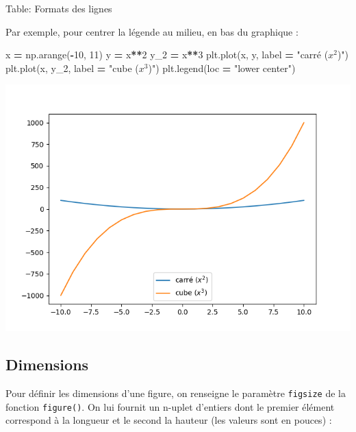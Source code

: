 \documentclass[12pt,]{book}
\newenvironment{Shaded}{\begin{snugshade}}{\end{snugshade}}
\newcommand{\DecValTok}[1]{\textcolor[rgb]{0.00,0.00,0.81}{#1}}
\newcommand{\StringTok}[1]{\textcolor[rgb]{0.31,0.60,0.02}{#1}}
\newcommand{\OperatorTok}[1]{\textcolor[rgb]{0.81,0.36,0.00}{\textbf{#1}}}
\newcommand{\NormalTok}[1]{#1}
\numberwithin{equation}{section}
\numberwithin{countremarque}{section}
\begin{document}
Table: \label{tab:pyplot-legendes-loc} Formats des lignes

Par exemple, pour centrer la légende au milieu, en bas du graphique :

\begin{Shaded}
\begin{Highlighting}[]
\NormalTok{x }\OperatorTok{=}\NormalTok{ np.arange(}\OperatorTok{-}\DecValTok{10}\NormalTok{, }\DecValTok{11}\NormalTok{)}
\NormalTok{y }\OperatorTok{=}\NormalTok{ x}\OperatorTok{**}\DecValTok{2}
\NormalTok{y_2 }\OperatorTok{=}\NormalTok{ x}\OperatorTok{**}\DecValTok{3}
\NormalTok{plt.plot(x, y, label }\OperatorTok{=} \StringTok{"carré ($x^2$)"}\NormalTok{)}
\NormalTok{plt.plot(x, y_2, label }\OperatorTok{=} \StringTok{"cube ($x^3$)"}\NormalTok{)}
\NormalTok{plt.legend(loc }\OperatorTok{=} \StringTok{"lower center"}\NormalTok{)}
\end{Highlighting}
\end{Shaded}

\begin{center}\includegraphics[width=9.03in]{figs/pyplot/plot_legende_pos} \end{center}

\subsection{Dimensions}\label{dimensions-2}

Pour définir les dimensions d'une figure, on renseigne le paramètre
\texttt{figsize} de la fonction \texttt{figure()}. On lui fournit un
n-uplet d'entiers dont le premier élément correspond à la longueur et le
second la hauteur (les valeurs sont en pouces) :
\end{document}
